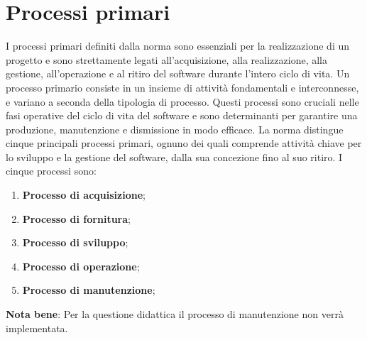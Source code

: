\section{Processi primari}
\label{sec:Processi_Primari}
I processi primari definiti dalla norma  sono essenziali per la realizzazione di un progetto e sono strettamente legati all'acquisizione, alla realizzazione, alla gestione, all'operazione e al ritiro del software durante l'intero ciclo di vita. 
Un processo primario consiste in un insieme di attività fondamentali e interconnesse, e variano a seconda della tipologia di processo.
Questi processi sono cruciali nelle fasi operative del ciclo di vita del software e sono determinanti per garantire una produzione, manutenzione e dismissione in modo efficace. La norma distingue cinque principali processi primari, ognuno dei quali comprende attività chiave per lo sviluppo e la gestione del software, dalla sua concezione fino al suo ritiro.
I cinque processi sono:
\begin{enumerate}
    \item \textbf{Processo di acquisizione}; 
    \item \textbf{Processo di fornitura}; 
    \item \textbf{Processo di sviluppo};
    \item \textbf{Processo di operazione}; 
    \item \textbf{Processo di manutenzione};
\end{enumerate}
\textbf{Nota bene}: Per la questione didattica il processo di manutenzione non verrà implementata.





